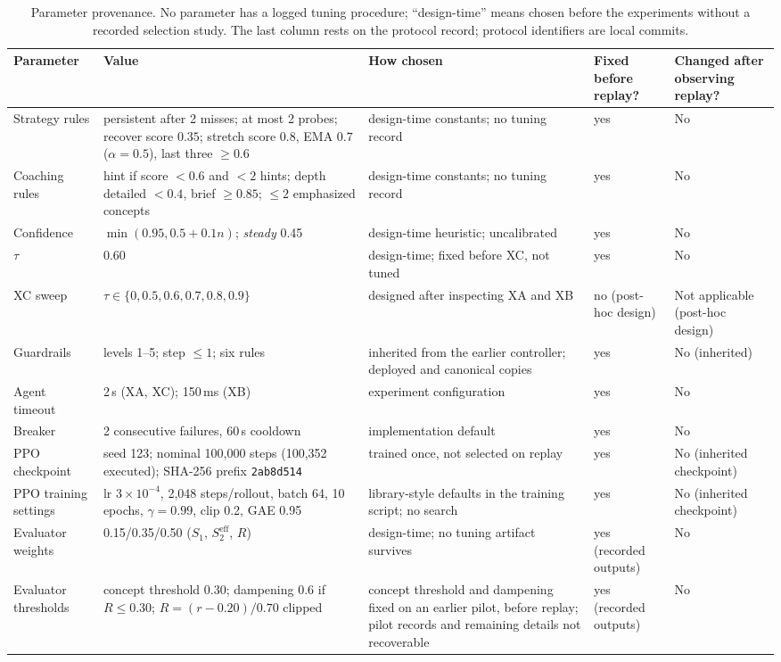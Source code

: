 \documentclass[runningheads,a4paper]{llncs}
\begin{document}
\begin{table}[!htbp]
\caption{Parameter provenance. No parameter has a logged tuning procedure; ``design-time'' means chosen before the experiments without a recorded selection study. The last column rests on the protocol record; protocol identifiers are local commits.}
\label{tab:prov}
\centering\scriptsize
\begin{tabular}{@{}L{1.5cm}L{3.7cm}L{2.8cm}L{1.2cm}L{2.2cm}@{}}
\toprule
Parameter & Value & How chosen & Fixed before replay? & Changed after observing replay?\\
\midrule
Strategy rules & persistent after 2 misses; at most 2 probes; recover score $0.35$; stretch score $0.8$, EMA $0.7$ ($\alpha=0.5$), last three $\ge0.6$ & design-time constants; no tuning record & yes & No\\
Coaching rules & hint if score $<0.6$ and $<2$ hints; depth detailed $<0.4$, brief $\ge0.85$; $\le2$ emphasized concepts & design-time constants; no tuning record & yes & No\\
Confidence & $\min(0.95,0.5+0.1n)$; \emph{steady} 0.45 & design-time heuristic; uncalibrated & yes & No\\
$\tau$ & 0.60 & design-time; fixed before XC, not tuned & yes & No\\
XC sweep & $\tau\in\{0,0.5,0.6,0.7,0.8,0.9\}$ & designed after inspecting XA and XB & no (post-hoc design) & Not applicable (post-hoc design)\\
Guardrails & levels 1--5; step $\le1$; six rules & inherited from the earlier controller; deployed and canonical copies & yes & No (inherited)\\
Agent timeout & 2\,s (XA, XC); 150\,ms (XB) & experiment configuration & yes & No\\
Breaker & 2 consecutive failures, 60\,s cooldown & implementation default & yes & No\\
PPO checkpoint & seed 123; nominal 100,000 steps (100,352 executed); SHA-256 prefix \texttt{2ab8d514} & trained once, not selected on replay & yes & No (inherited checkpoint)\\
PPO training settings & lr $3\times10^{-4}$, 2,048 steps/rollout, batch 64, 10 epochs, $\gamma=0.99$, clip 0.2, GAE 0.95 & library-style defaults in the training script; no search & yes & No (inherited checkpoint)\\
Evaluator weights & 0.15/0.35/0.50 ($S_1$, $S_2^{\mathrm{eff}}$, $R$) & design-time; no tuning artifact survives & yes (recorded outputs) & No\\
Evaluator thresholds & concept threshold 0.30; dampening 0.6 if $R\le0.30$; $R=(r-0.20)/0.70$ clipped & concept threshold and dampening fixed on an earlier pilot, before replay; pilot records and remaining details not recoverable & yes (recorded outputs) & No\\

\end{tabular}
\end{table}
\end{document}
